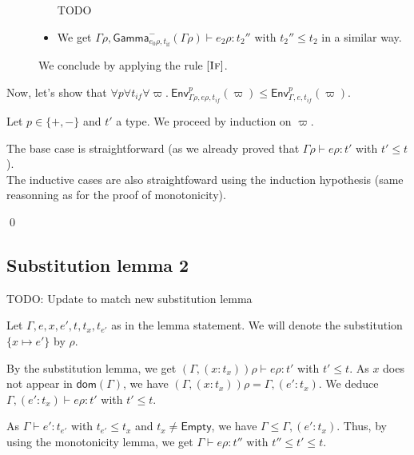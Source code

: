 \documentclass[a4paper]{article}%
\newcommand{\dom}[1]{\textsf{dom}(#1)}
\newcommand{\Empty} {\textsf{Empty}}%
\newcommand{\subst}[2]{\{#1 \mapsto #2\}}
\newcommand{\Gp}[2]{\textsf{Env}^{#1}_{#2}}
\newcommand{\Genv}[3]{\textsf{Gamma}^{#1}_{#2}(#3)}
\theoremstyle{definition}
\newcommand {\Rule}[1] {[\textsc{#1}]}
\begin{document}
\begin{description}
\begin{itemize}
            TODO
    
            \item We get $\Gamma\rho, \Genv - {e_0\rho,t_{\text{if}}} {\Gamma\rho}\vdash e_2\rho:t_2''$ with $t_2'' \leq t_2$ in a similar way.
          \end{itemize}
          We conclude by applying the rule $\Rule {If}$.
        \end{description}
    
        Now, let's show that $\forall p \forall t_{if} \forall \varpi.\ \Gp p {\Gamma\rho,e\rho,t_{if}} (\varpi) \leq \Gp p {\Gamma,e,t_{if}} (\varpi)$.
    
        Let $p\in \{+,-\}$ and $t'$ a type.
        We proceed by induction on $\varpi$.
    
        The base case is straightforward (as we already proved that $\Gamma \rho \vdash e \rho:t'$ with $t'\leq t$).\\
        The inductive cases are also straightfoward using the induction hypothesis (same reasonning as for the proof of monotonicity).
    
        \qed
    
        \subsection{Substitution lemma 2}

        TODO: Update to match new substitution lemma
    
        Let $\Gamma,e,x,e',t,t_x,t_{e'}$ as in the lemma statement.
        We will denote the substitution $\subst x {e'}$ by $\rho$.
    
        By the substitution lemma, we get $(\Gamma, (x:t_x))\rho \vdash e\rho:t'$ with $t' \leq t$.
        As $x$ does not appear in $\dom \Gamma$, we have $(\Gamma, (x:t_x))\rho = \Gamma, (e':t_x)$.
        We deduce $\Gamma, (e':t_x) \vdash e\rho:t'$ with $t' \leq t$.
    
        As $\Gamma \vdash e':t_{e'}$ with $t_{e'} \leq t_x$ and $t_x \neq \Empty$, we have $\Gamma \leq \Gamma, (e':t_x)$.
        Thus, by using the monotonicity lemma, we get $\Gamma\vdash e\rho:t''$ with $t'' \leq t' \leq t$.
    
\end{document}
